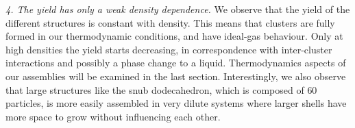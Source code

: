\documentclass[a4paper, amsfonts, amssymb, amsmath, reprint, showkeys, nofootinbib, oneside]{revtex4-1}
\begin{document}


\noindent
\emph{4. The yield has only a weak density dependence.} We observe that the yield of the different structures is constant with density. This means that clusters are fully formed in our thermodynamic conditions, and have ideal-gas behaviour. Only at high densities the yield starts decreasing, in correspondence with inter-cluster interactions and possibly a phase change to a liquid. Thermodynamics aspects of our assemblies will be examined in the last section. Interestingly, we also observe that large structures like the snub dodecahedron, which is composed of $60$ particles, is more easily assembled in very dilute systems where larger shells have more space to grow without influencing each other.
\end{document}
